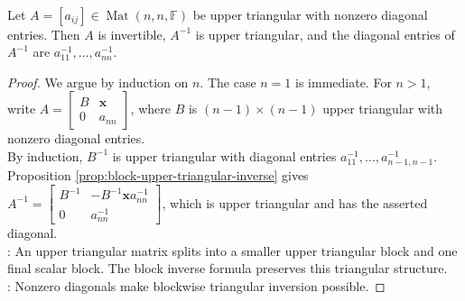 \begin{theorem} \label{thm:inverse-upper-triangular} \\
Let $A=[a_{ij}]\in\operatorname{Mat}(n,n,\mathbb{F})$ be upper triangular with nonzero diagonal entries. Then $A$ is invertible, $A^{-1}$ is upper triangular, and the diagonal entries of $A^{-1}$ are $a_{11}^{-1},\ldots,a_{nn}^{-1}$.
\begin{proof}
We argue by induction on $n$. The case $n=1$ is immediate. For $n>1$, write $A=
\begin{bmatrix}
B & \mathbf{x}\\
0 & a_{nn}
\end{bmatrix}$, where $B$ is $(n-1)\times(n-1)$ upper triangular with nonzero diagonal entries.\\
By induction, $B^{-1}$ is upper triangular with diagonal entries $a_{11}^{-1},\ldots,a_{n-1,n-1}^{-1}$.\\
Proposition \ref{prop:block-upper-triangular-inverse} gives $A^{-1}=
\begin{bmatrix}
B^{-1} & -B^{-1}\mathbf{x}a_{nn}^{-1}\\
0 & a_{nn}^{-1}
\end{bmatrix}$,
which is upper triangular and has the asserted diagonal.\\
: An upper triangular matrix splits into a smaller upper triangular block and one final scalar block. The block inverse formula preserves this triangular structure.\\
: Nonzero diagonals make blockwise triangular inversion possible.
\end{proof}
\end{theorem}

